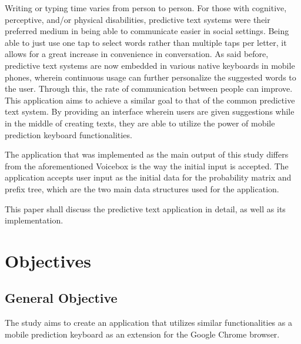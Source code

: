 \documentclass[journal]{./IEEE/IEEEtran}
\begin{document}
Writing or typing time varies from person to person. For those with cognitive, perceptive, and/or physical disabilities, predictive text systems were their preferred medium in being able to communicate easier in social settings. \cite{GV2006} Being able to just use one tap to select words rather than multiple taps per letter, it allows for a great increase in convenience in conversation. As said before, predictive text systems are now embedded in various native keyboards in mobile phones, wherein continuous usage can further personalize the suggested words to the user. Through this, the rate of communication between people can improve. This application aims to achieve a similar goal to that of the common predictive text system. By providing an interface wherein users are given suggestions while in the middle of creating texts, they are able to utilize the power of mobile prediction keyboard functionalities.


The application that was implemented as the main output of this study differs from the aforementioned Voicebox is the way the initial input is accepted. The application accepts user input as the initial data for the probability matrix and prefix tree, which are the two main data structures used for the application.

This paper shall discuss the predictive text application in detail, as well as its implementation.

\section{Objectives}

\subsection{General Objective}
The study aims to create an application that utilizes similar functionalities as a mobile prediction keyboard as an extension for the Google Chrome browser.
\end{document}
